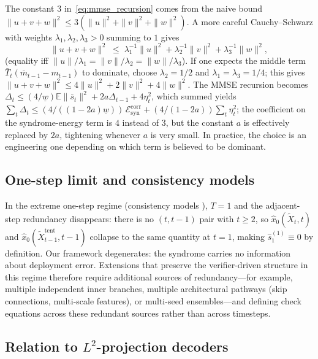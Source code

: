 \documentclass{article}
\theoremstyle{plain}
\theoremstyle{definition}
\theoremstyle{remark}
\begin{document}
The constant \(3\) in~\eqref{eq:mmse_recursion} comes from the naive
bound \(\|u+v+w\|^2 \le 3(\|u\|^2+\|v\|^2+\|w\|^2)\). A more careful
Cauchy--Schwarz with weights \(\lambda_1,\lambda_2,\lambda_3>0\) summing to
\(1\) gives
\begin{equation*}
\|u+v+w\|^2 \;\le\; \lambda_1^{-1}\|u\|^2 + \lambda_2^{-1}\|v\|^2 + \lambda_3^{-1}\|w\|^2,
\end{equation*}
(equality iff \(\|u\|/\lambda_1 = \|v\|/\lambda_2 = \|w\|/\lambda_3\)). If
one expects the middle term \(\bar T_t(\bar m_{t-1}-m_{t-1})\) to dominate,
choose \(\lambda_2 = 1/2\) and \(\lambda_1 = \lambda_3 = 1/4\); this gives
\(\|u+v+w\|^2 \le 4\|u\|^2 + 2\|v\|^2 + 4\|w\|^2\). The MMSE recursion
becomes \(\Delta_t \le (4/\underline w)\mathbb{E}\|\bar s_t\|^2 + 2a\Delta_{t-1} + 4\eta_t^2\),
which summed yields
\(\sum_t \Delta_t \le (4/((1-2a)\underline w))\,\mathcal{E}^{\mathrm{corr}}_{\mathrm{syn}}
+ (4/(1-2a))\sum_t\eta_t^2\); the coefficient on the syndrome-energy term is
\(4\) instead of \(3\), but the constant \(a\) is effectively replaced by
\(2a\), tightening whenever \(a\) is very small. In practice, the choice
is an engineering one depending on which term is believed to be dominant.

\subsection{One-step limit and consistency models}

In the extreme one-step regime (consistency models
\citep{song2023consistency}), \(T = 1\) and the adjacent-step redundancy
disappears: there is no \((t,t-1)\) pair with \(t\ge 2\), so
\(\hat x_0(\tilde X_t,t)\) and \(\hat x_0(\tilde X_{t-1}^{\mathrm{tent}},
t-1)\) collapse to the same quantity at \(t=1\), making
\(\hat s_1^{(1)} \equiv 0\) by definition. Our framework degenerates: the
syndrome carries no information about deployment error. Extensions that
preserve the verifier-driven structure in this regime therefore require
additional sources of redundancy---for example, multiple independent inner
branches, multiple architectural pathways (skip connections, multi-scale
features), or multi-seed ensembles---and defining check equations across
these redundant sources rather than across timesteps.

\subsection{\texorpdfstring{Relation to $L^2$-projection decoders}{Relation to L2-projection decoders}}
\end{document}
